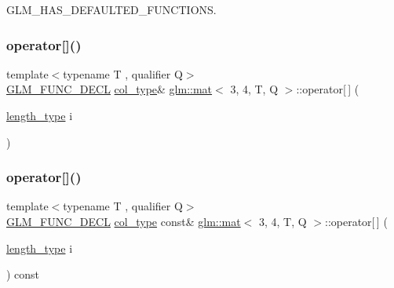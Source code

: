 G\+L\+M\+\_\+\+H\+A\+S\+\_\+\+D\+E\+F\+A\+U\+L\+T\+E\+D\+\_\+\+F\+U\+N\+C\+T\+I\+O\+NS. 

\mbox{\label{structglm_1_1mat_3_013_00_014_00_01_t_00_01_q_01_4_a2cc3ce3e5d6807a9ec433b51f16ecd8a}} 
\subsubsection{\texorpdfstring{operator[]()}{operator[]()}\hspace{0.1cm}{\footnotesize\ttfamily [1/2]}}
{\footnotesize\ttfamily template$<$typename T , qualifier Q$>$ \\
\hyperlink{setup_8hpp_ab2d052de21a70539923e9bcbf6e83a51}{G\+L\+M\+\_\+\+F\+U\+N\+C\+\_\+\+D\+E\+CL} \hyperlink{structglm_1_1mat_3_013_00_014_00_01_t_00_01_q_01_4_aaa23c4674cbe2dc1eda1d826b8ef721e}{col\+\_\+type}\& \hyperlink{structglm_1_1mat}{glm\+::mat}$<$ 3, 4, T, Q $>$\+::operator\mbox{[}$\,$\mbox{]} (\begin{DoxyParamCaption}\item[{\hyperlink{structglm_1_1mat_3_013_00_014_00_01_t_00_01_q_01_4_a6a07c3870b8e6d4ba5f1ec8fa988d9bf}{length\+\_\+type}}]{i }\end{DoxyParamCaption})}

\mbox{\label{structglm_1_1mat_3_013_00_014_00_01_t_00_01_q_01_4_a1abef793b9078730b053df8ff6a37256}} 
\subsubsection{\texorpdfstring{operator[]()}{operator[]()}\hspace{0.1cm}{\footnotesize\ttfamily [2/2]}}
{\footnotesize\ttfamily template$<$typename T , qualifier Q$>$ \\
\hyperlink{setup_8hpp_ab2d052de21a70539923e9bcbf6e83a51}{G\+L\+M\+\_\+\+F\+U\+N\+C\+\_\+\+D\+E\+CL} \hyperlink{structglm_1_1mat_3_013_00_014_00_01_t_00_01_q_01_4_aaa23c4674cbe2dc1eda1d826b8ef721e}{col\+\_\+type} const\& \hyperlink{structglm_1_1mat}{glm\+::mat}$<$ 3, 4, T, Q $>$\+::operator\mbox{[}$\,$\mbox{]} (\begin{DoxyParamCaption}\item[{\hyperlink{structglm_1_1mat_3_013_00_014_00_01_t_00_01_q_01_4_a6a07c3870b8e6d4ba5f1ec8fa988d9bf}{length\+\_\+type}}]{i }\end{DoxyParamCaption}) const}



